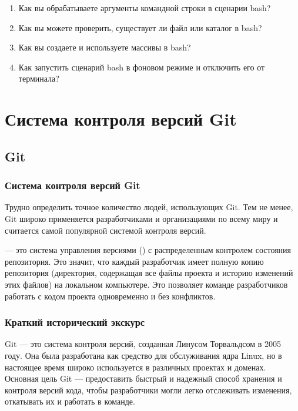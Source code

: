 \documentclass[letterpaper,10pt,russian]{sphinxmanual}
\begin{document}
\begin{enumerate}
\item {} 
\sphinxAtStartPar
Как вы обрабатываете аргументы командной строки в сценарии bash?

\item {} 
\sphinxAtStartPar
Как вы можете проверить, существует ли файл или каталог в bash?

\item {} 
\sphinxAtStartPar
Как вы создаете и используете массивы в bash?

\item {} 
\sphinxAtStartPar
Как запустить сценарий bash в фоновом режиме и отключить его от терминала?

\end{enumerate}


\chapter{Система контроля версий Git}
\label{\detokenize{index:git}}
\sphinxstepscope


\section{Git}
\label{\detokenize{educational_materials/git_base/content:git}}\label{\detokenize{educational_materials/git_base/content::doc}}

\subsection{Система контроля версий Git}
\label{\detokenize{educational_materials/git_base/content:id1}}
\sphinxAtStartPar
Трудно определить точное количество людей, использующих Git. Тем не менее, Git широко применяется разработчиками и организациями по всему миру и считается самой популярной системой контроля версий.

\sphinxAtStartPar
{}

\sphinxAtStartPar
{} — это система управления версиями () с распределенным контролем состояния репозитория. Это значит, что каждый разработчик имеет полную копию репозитория (директория, содержащая все файлы проекта и историю изменений этих файлов) на локальном компьютере. Это позволяет команде разработчиков работать с кодом проекта одновременно и без конфликтов.


\subsection{Краткий исторический экскурс}
\label{\detokenize{educational_materials/git_base/content:id2}}
\sphinxAtStartPar
Git — это система контроля версий, созданная Линусом Торвальдсом в 2005 году. Она была разработана как средство для обслуживания ядра Linux, но в настоящее время широко используется в различных проектах и доменах. Основная цель Git — предоставить быстрый и надежный способ хранения и контроля версий кода, чтобы разработчики могли легко отслеживать изменения, откатывать их и работать в команде.
\end{document}
